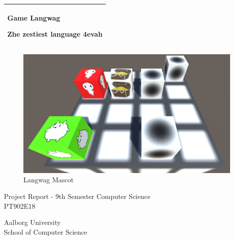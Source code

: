 %
\begin{titlepage}
  \addtolength{\hoffset}{0.5\evensidemargin-0.5\oddsidemargin} %
  \noindent%
  \begin{tabular}{@{}p{\textwidth}@{}}
    \toprule[2pt]
    \midrule
    \vspace{0.2cm}
    \begin{center}
    \Huge{\textbf{
      Game Langwag%
    }}
    \end{center}
    \begin{center}
      \Large{
        Zhe zestiest language 4evah %
      }
    \end{center}
    \vspace{0.2cm}\\
    \midrule
    \toprule[2pt]
  \end{tabular}
  \vspace{4 cm}
  \begin{center}
    \begin{figure}[h!]
        \centering
        \includegraphics[width=\textwidth]{images/Wumpus_Unity.png}
        \caption{Langwag Mascot}
        \label{fig:langwag:mascot}
    \end{figure}
    {\large
      Project Report - 9th Semester Computer Science %
    }\\
    \vspace{0.2cm}
    {\Large
      PT902E18%
    }
  \end{center}
  \vfill
  \begin{center}
  Aalborg University\\
  School of Computer Science
  \end{center}
\end{titlepage}
\clearpage
